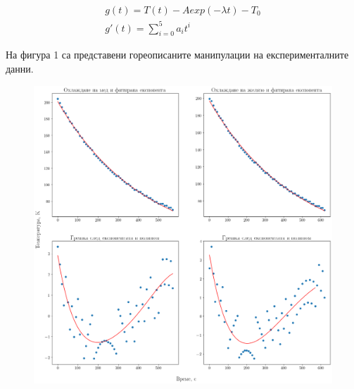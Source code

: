 \documentclass[
 reprint,
 amsmath,amssymb,
 aps,
]{revtex4-2}
\begin{document}
\begin{gather*}
    g(t) = T(t) - A exp(-\lambda t) - T_0 \\ 
    g'(t) = \sum_{i=0}^{5}{a_i t^i}
\end{gather*}

На фигура 1 са представени гореописаните манипулации на експерименталните данни. 

\begin{figure}
    \centering
    \includegraphics[width=0.9\columnwidth, keepaspectratio=true]{graph1.png}
\end{figure}
\end{document}
